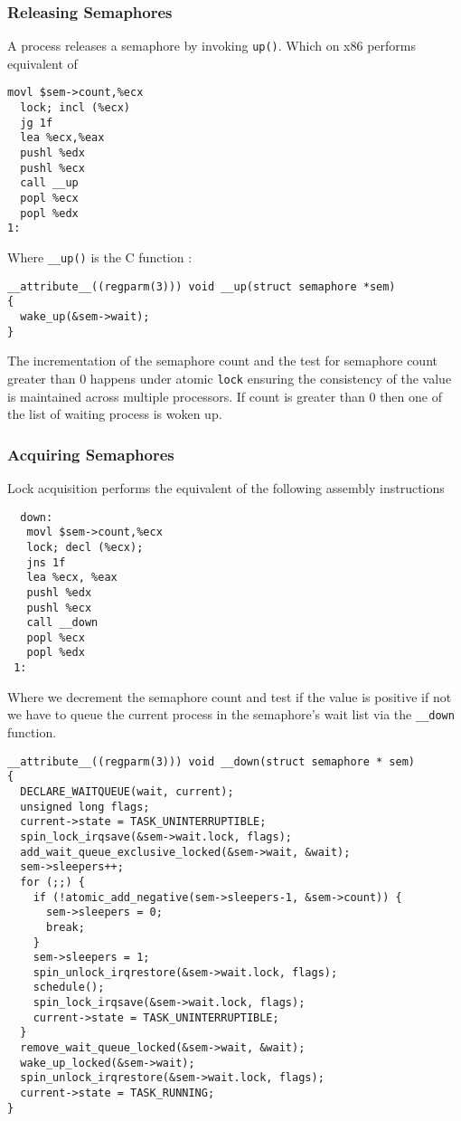 \documentclass{article}
\begin{document}

\subsubsection{Releasing Semaphores}

A process releases a semaphore by invoking \lstinline{up()}. Which on
x86 performs equivalent of

\begin{lstlisting}[language=anX86]
  movl $sem->count,%ecx
  lock; incl (%ecx)
  jg 1f
  lea %ecx,%eax
  pushl %edx
  pushl %ecx
  call __up
  popl %ecx
  popl %edx
1:
\end{lstlisting}

Where \lstinline{__up()} is the C function :

\begin{lstlisting}
__attribute__((regparm(3))) void __up(struct semaphore *sem)
{
  wake_up(&sem->wait);
}  
\end{lstlisting}

The incrementation of the semaphore count and the test for semaphore
count greater than 0 happens under atomic \lstinline{lock} ensuring the
consistency of the value is maintained across multiple processors. If
count is greater than 0 then one of the list of waiting process is
woken up.

\subsubsection{Acquiring Semaphores}

Lock acquisition performs the equivalent of the following assembly
instructions

\begin{lstlisting}
  down:
   movl $sem->count,%ecx
   lock; decl (%ecx);
   jns 1f
   lea %ecx, %eax
   pushl %edx
   pushl %ecx
   call __down
   popl %ecx
   popl %edx
 1:
\end{lstlisting}

Where we decrement the semaphore count and test if the value is
positive if not we have to queue the current process in the
semaphore's wait list via the \lstinline{__down} function.

\begin{lstlisting}
__attribute__((regparm(3))) void __down(struct semaphore * sem)
{
  DECLARE_WAITQUEUE(wait, current);
  unsigned long flags;
  current->state = TASK_UNINTERRUPTIBLE;
  spin_lock_irqsave(&sem->wait.lock, flags);
  add_wait_queue_exclusive_locked(&sem->wait, &wait);
  sem->sleepers++;
  for (;;) {
    if (!atomic_add_negative(sem->sleepers-1, &sem->count)) {
      sem->sleepers = 0;
      break;
    }
    sem->sleepers = 1;
    spin_unlock_irqrestore(&sem->wait.lock, flags);
    schedule();
    spin_lock_irqsave(&sem->wait.lock, flags);
    current->state = TASK_UNINTERRUPTIBLE;
  }
  remove_wait_queue_locked(&sem->wait, &wait);
  wake_up_locked(&sem->wait);
  spin_unlock_irqrestore(&sem->wait.lock, flags);
  current->state = TASK_RUNNING;
}
\end{lstlisting}
\end{document}
